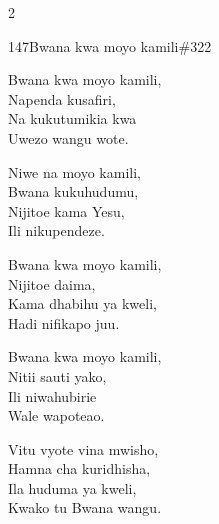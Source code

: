 \begin{multicols}{2}
\begin{hymn}{147}{Bwana kwa moyo kamili}{\#322}
\begin{stanza}
Bwana kwa moyo kamili,\\
Napenda kusafiri,\\
Na kukutumikia kwa\\
Uwezo wangu wote.
\end{stanza}
\begin{chorus}
Niwe na moyo kamili,\\
Bwana kukuhudumu,\\
Nijitoe kama Yesu,\\
Ili nikupendeze.
\end{chorus}
\begin{stanza}
Bwana kwa moyo kamili,\\
Nijitoe daima,\\
Kama dhabihu ya kweli,\\
Hadi nifikapo juu.
\end{stanza}
\begin{stanza}
Bwana kwa moyo kamili,\\
Nitii sauti yako,\\
Ili niwahubirie\\
Wale wapoteao.
\end{stanza}
\begin{stanza}
Vitu vyote vina mwisho,\\
Hamna cha kuridhisha,\\
Ila huduma ya kweli,\\
Kwako tu Bwana wangu.
\end{stanza}
\end{hymn}


\end{multicols}
